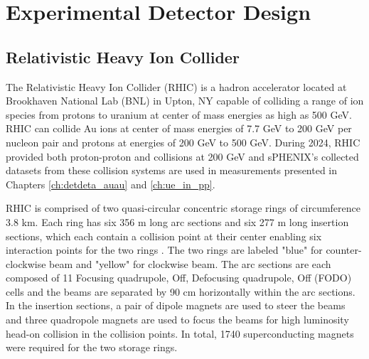 \chapter{Experimental Detector Design}
\label{ch:detector}

\section{Relativistic Heavy Ion Collider}

The Relativistic Heavy Ion Collider (RHIC) is a hadron accelerator located at Brookhaven National Lab (BNL) in Upton, NY capable of colliding a range of ion species from protons to uranium at center of mass energies as high as 500 GeV.
RHIC can collide Au ions at center of mass energies of 7.7 GeV to 200 GeV per nucleon pair and protons at energies of 200 GeV to 500 GeV.
During 2024, RHIC provided both proton-proton and \auau{} collisions at 200 GeV and sPHENIX's collected datasets from these collision systems are used in measurements presented in Chapters \ref{ch:detdeta_auau} and \ref{ch:ue_in_pp}.

RHIC is comprised of two quasi-circular concentric storage rings of circumference 3.8 km.
Each ring has six 356 m long arc sections and six 277 m long insertion sections, which each contain a collision point at their center enabling six interaction points for the two rings \cite{rhic_overview}. 
The two rings are labeled "blue" for counter-clockwise beam and "yellow" for clockwise beam. 
The arc sections are each composed of 11 Focusing quadrupole, Off, Defocusing quadrupole, Off (FODO) cells and the beams are separated by 90 cm horizontally within the arc sections.
In the insertion sections, a pair of dipole magnets are used to steer the beams and three quadropole magnets are used to focus the beams for high luminosity head-on collision in the collision points. 
In total, 1740 superconducting magnets were required for the two storage rings. 

